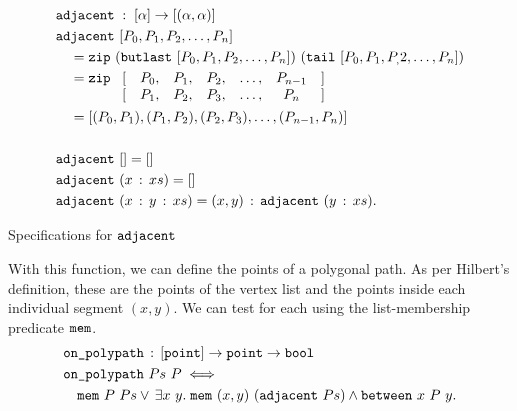 \begin{boxedfigure}
\begin{align*}
  &\code{adjacent}\; : \; [\alpha] \rightarrow [(\alpha,\alpha)]\\
  &\code{adjacent}\ [P_0,P_1,P_2,\ldots,P_n]\\
  &\quad=\code{zip}\ (\code{butlast}\ [P_0,P_1,P_2,\ldots,P_n])\ (\code{tail}\ [P_0,P_1,P_,2,\ldots,P_n])\\
  &\quad= \code{zip}\ \begin{array}[t]{rcccccl}\lbrack & P_0,&P_1,&P_2,&\ldots,&P_{n-1}&\rbrack\\
    \lbrack & P_1,&P_2,&P_3,&\ldots,&P_n&\rbrack
  \end{array}\\
  &\quad= [(P_0,P_1),(P_1,P_2),(P_2,P_3),\ldots,(P_{n-1},P_n)]\\\\
  &\code{adjacent}\ [] = []\\
  &\code{adjacent}\ (\cons{x}{xs}) = []\\
  &\code{adjacent}\ (\cons{x}{\cons{y}{xs}}) = \cons{(x,y)}{\code{adjacent}\ (\cons{y}{xs})}.
\end{align*}
\caption{Specifications for $\texttt{adjacent}$}
\label{fig:AdjacentSpec}
\end{boxedfigure}

With this function, we can define the points of a polygonal path. As per Hilbert's definition, these are the points of the vertex list and the points inside each individual segment $(x,y)$. We can test for each using the list-membership predicate $\texttt{mem}$.
\begin{equation}\label{eq:OnPolyPath}
  \begin{split}
    &\code{on\_polypath}\,:\,[\code{point}] \rightarrow \code{point} \rightarrow \code{bool}\\
    &\code{on\_polypath}\ Ps\ P \iff \\
    &\quad\code{mem}\ P\ Ps\vee\,\exists x\ y.\; \code{mem}\ (x,y)\ (\code{adjacent}\ Ps) \wedge \between{x}{P}{y}.
  \end{split}
\end{equation}


